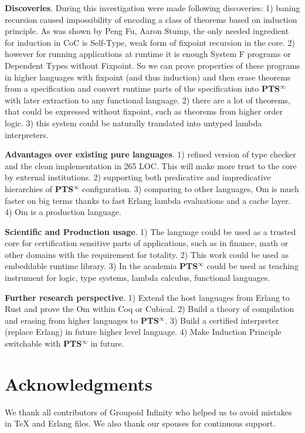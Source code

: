 \documentclass{aip-cp}
\begin{document}
{\bf Discoveries}. During this investigation were made following discoveries:
1) baning recursion caused impossibility of encoding a class of theorems
based on induction principle. As was shown by Peng Fu, Aaron Stump\cite{Fu14}, the only needed
ingredient for induction in CoC is Self-Type, weak form of fixpoint recursion in the core.
2) however for running applications at runtime it is enough System F
programs or Dependent Types without Fixpoint.
So we can prove properties of these programs in higher languages
with fixpoint (and thus induction) and then erase theorems from a specification and convert
runtime parts of the specification into {\bf PTS$^\infty$} with later extraction to any functional language.
2) there are a lot of theorems, that could be expressed without fixpoint,
such as theorems from higher order logic.
3) this system could be naturally translated into untyped lambda interpreters.

{\bf Advantages over existing pure languages}.
1) refined version of type checker and the clean implementation in 265 LOC.
This will make more trust to the core by external institutions.
2) supporting both predicative and impredicative hierarchies of {\bf PTS$^\infty$} configuration.
3) comparing to other languages, Om is much faster on big terms
thanks to fast Erlang lambda evaluations and a cache layer.
4) Om is a production language.

{\bf Scientific and Production usage}.
1) The language could be used as a trusted core for certification sensitive parts of applications,
such as in finance, math or other domains with the requirement for totality.
2) This work could be used as embeddable runtime library.
3) In the academia {\bf PTS$^\infty$} could be used as teaching instrument for logic,
type systems, lambda calculus, functional languages.

{\bf Further research perspective}.
1) Extend the host languages from Erlang to Rust and prove the Om within Coq or Cubical.
2) Build a theory of compilation and erasing from higher languages to {\bf PTS$^\infty$}.
3) Build a certified interpreter (replace Erlang) in future higher level language.
4) Make Induction Principle switchable with {\bf PTS$^\infty$} in future.

\section{Acknowledgments}
We thank all contributors of Groupoid Infinity who helped us to avoid mistakes
in TeX and Erlang files. We also thank our spouses for continuous support.



\newpage
\tableofcontents
\end{document}
